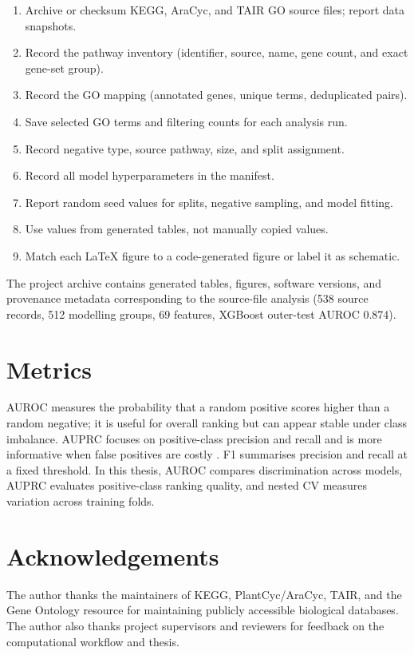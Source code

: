 \documentclass[12pt,letterpaper,oneside,openany]{book}
\begin{document}
\begin{enumerate}[leftmargin=*]
  \item Archive or checksum KEGG, AraCyc, and TAIR GO source files; report data snapshots.
  \item Record the pathway inventory (identifier, source, name, gene count, and exact gene-set group).
  \item Record the GO mapping (annotated genes, unique terms, deduplicated pairs).
  \item Save selected GO terms and filtering counts for each analysis run.
  \item Record negative type, source pathway, size, and split assignment.
  \item Record all model hyperparameters in the manifest.
  \item Report random seed values for splits, negative sampling, and model fitting.
  \item Use values from generated tables, not manually copied values.
  \item Match each LaTeX figure to a code-generated figure or label it as schematic.
\end{enumerate}

The project archive contains generated tables, figures, software versions, and provenance metadata corresponding to the source-file analysis (538 source records, 512 modelling groups, 69 features, XGBoost outer-test AUROC 0.874).

\chapter{Metrics}
\label{app:metrics}

AUROC measures the probability that a random positive scores higher than a random negative; it is useful for overall ranking but can appear stable under class imbalance. AUPRC focuses on positive-class precision and recall and is more informative when false positives are costly \citep{saito2015precision}. F1 summarises precision and recall at a fixed threshold. In this thesis, AUROC compares discrimination across models, AUPRC evaluates positive-class ranking quality, and nested CV measures variation across training folds.


\chapter*{Acknowledgements}
The author thanks the maintainers of KEGG, PlantCyc/AraCyc, TAIR, and the Gene Ontology resource for maintaining publicly accessible biological databases. The author also thanks project supervisors and reviewers for feedback on the computational workflow and thesis.
\end{document}
